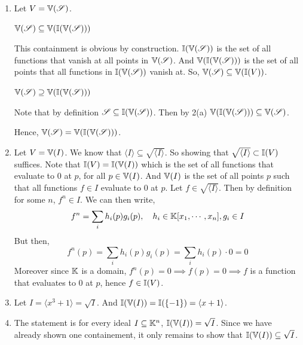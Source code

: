 \documentclass[Notebook.tex]{subfiles}
\begin{document}
\begin{solution}
    \bbni
    \begin{enumerate}
        \item Let $V =\mathbb V(\operatorname{\mathscr S})$. 
        
        $\mathbb V(\operatorname{\mathscr S}) \subseteq \mathbb V(\mathbb I(\mathbb V(\operatorname{\mathscr S})))$

        This containment is obvious by construction. $\mathbb I(\mathbb V(\operatorname{\mathscr S}))$ is the set of all functions that vanish at all points in $\mathbb V(\operatorname{\mathscr S})$. And $\mathbb V(\mathbb I(\mathbb V(\operatorname{\mathscr S})))$ is the set of all points that all functions in $\mathbb I(\mathbb V(\operatorname{\mathscr S}))$ vanish at. So, $\mathbb V(\operatorname{\mathscr S}) \subseteq \mathbb V(\mathbb I(V))$. 

        \phantom{A}

        $\mathbb V(\operatorname{\mathscr S}) \supseteq \mathbb V(\mathbb I(\mathbb V(\operatorname{\mathscr S})))$

        Note that by definition $\operatorname{\mathscr S} \subseteq \mathbb I(\mathbb V(\operatorname{\mathscr S}))$. Then by 2(a) $\mathbb V(\mathbb I(\mathbb V(\operatorname{\mathscr S}))) \subseteq \mathbb V(\operatorname{\mathscr S})$.
        
        Hence, $\mathbb V(\operatorname{\mathscr S}) = \mathbb V(\mathbb I(\mathbb V(\operatorname{\mathscr S})))$.

        \item Let $V = \mathbb V(I)$. We know that $\langle I \rangle \subseteq \sqrt{\langle I \rangle}$. So showing that $\sqrt{\langle I \rangle} \subset \mathbb I(V)$ suffices. Note that 
        $\mathbb I(V) = \mathbb I(\mathbb V(I))$ which is the set of all functions that evaluate to $0$ at $p$, for all $p \in \mathbb V(I)$. And $\mathbb V(I)$ is the set of all points $p$ such that all functions $f \in I$ evaluate to $0$ at $p$. Let $f \in \sqrt{\langle I \rangle}$. Then by definition for some $n$, $f^n \in I$. We can then write, 
        \[f^n = \sum_ih_i(p)g_i(p), \quad h_i \in \mathbb K[x_1, \cdots, x_n], g_i \in I\]
        But then, 
        \[f^n(p) = \sum_ih_i(p)g_i(p) = \sum_ih_i(p)\cdot 0 = 0\]
        Moreover since $\mathbb K$ is a domain, $f^n(p) = 0 \implies f(p) = 0 \implies f$ is a function that evaluates to $0$ at $p$, hence $f \in \mathbb I(V)$. 

        \item Let $I = \langle x^3 + 1 \rangle = \sqrt{I}$. And $\mathbb I(\mathbb V(I)) = \mathbb I(\{-1\}) = \langle x + 1\rangle$.
        
        \item The statement is for every ideal $I \subseteq \mathbb K^n$, $\mathbb I(\mathbb V(I)) = \sqrt{I}$. Since we have already shown one containement, it only remains to show that $\mathbb I(\mathbb V(I)) \subseteq \sqrt{I}$.
    \end{enumerate}
\end{solution}

\newpage 

\hrulefill
\end{document}
